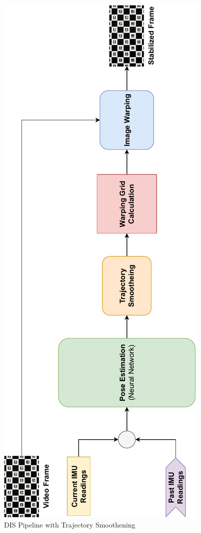 \begin{figure}[H]
    \centering
    \includegraphics[scale=0.78]{images/fig_chapter4/dis_smooth_pipeline.pdf}
    \caption{DIS Pipeline with Trajectory Smoothening}
    \label{fig:dis_smooth_pipeline}
\end{figure}

